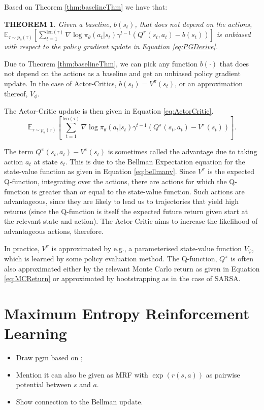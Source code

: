 \documentclass{report}
\newtheorem{theorem}{THEOREM}
\numberwithin{equation}{section}
\numberwithin{figure}{section}
\numberwithin{table}{section}
\numberwithin{algorithm}{section}
\begin{document}
Based on Theorem \ref{thm:baselineThm} we have that:
\begin{theorem}\label{thm:unbiasedBaseline}
  Given a baseline, $b(s_t)$, that does not depend on the actions,\\
  $\mathbb{E}_{\tau\sim p_\theta(\tau)}\left[\sum_{t=1}^{\text{len}(\tau)}\nabla \log \pi_\theta(a_t|s_t)
  \gamma^{t-1}\left(Q^{\pi}(s_t, a_t)-b(s_t)\right)\right]$ is unbiased with respect 
  to the policy gradient update in Equation \ref{eq:PGDerive}.
\end{theorem}
Due to Theorem \ref{thm:baselineThm}, we can pick any function 
$b(\cdot)$ that does not depend on the actions as a baseline and 
get an unbiased policy gradient update. In the case of Actor-Critics, 
$b(s_t)=V^{\pi}(s_t)$, or an approximation thereof, $V_{\phi}$.

The Actor-Critic update is then given in Equation \ref{eq:ActorCritic}.
\begin{equation}\label{eq:ActorCritic}
  \mathbb{E}_{\tau\sim p_\theta(\tau)}\left[\sum_{t=1}^{\text{len}(\tau)}\nabla \log \pi_\theta(a_t|s_t)
  \gamma^{t-1}\left(Q^{\pi}(s_t, a_t)-V^{\pi}(s_t)\right)\right].
\end{equation}

The term $Q^{\pi}(s_t,a_t)-V^{\pi}(s_t)$ is sometimes called the 
advantage due to taking action $a_t$ at state $s_t$. This is 
due to the Bellman Expectation equation for the state-value function 
as given in Equation \ref{eq:bellmanv}. Since $V^{\pi}$ is the 
expected Q-function, integrating over the actions, there are 
actions for which the Q-function is greater than or equal to the 
state-value function. Such actions are advantageous, since they are 
likely to lead us to trajectories that yield high returns (since the 
Q-function is itself the expected future return given start at 
the relevant state and action). The Actor-Critic aims to 
increase the likelihood of advantageous actions, therefore.

In practice, $V^{\pi}$ is approximated by e.g., a parameterised 
state-value function $V_\psi$, which is learned by some policy 
evaluation method. The Q-function, $Q^{\pi}$ is often also approximated 
either by the relevant Monte Carlo return as given in Equation 
\ref{eq:MCReturn} or approximated by bootstrapping as in the 
case of SARSA.

\section{Maximum Entropy Reinforcement Learning}\label{sec:MaxEntRL}
\begin{itemize}
  \item Draw pgm based on \citep{LevineRLasInf};
  \item Mention it can also be given as MRF with $\exp(r(s, a))$ 
  as pairwise potential between $s$ and $a$.
  \item Show connection to the Bellman update.
\end{itemize}
\end{document}
